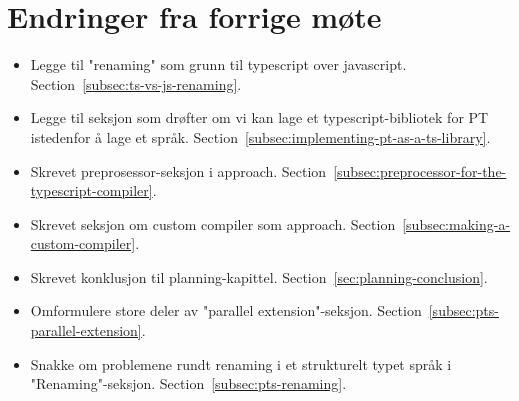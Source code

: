 
\chapter*{Endringer fra forrige møte}

\begin{itemize}
    \item Legge til "renaming" som grunn til typescript over javascript.
    Section~\vref{subsec:ts-vs-js-renaming}.
    \item Legge til seksjon som drøfter om vi kan lage et typescript-bibliotek for PT istedenfor å lage et språk.
    Section~\vref{subsec:implementing-pt-as-a-ts-library}.
    \item Skrevet preprosessor-seksjon i approach.
    Section~\vref{subsec:preprocessor-for-the-typescript-compiler}.
    \item Skrevet seksjon om custom compiler som approach.
    Section~\vref{subsec:making-a-custom-compiler}.
    \item Skrevet konklusjon til planning-kapittel.
    Section~\vref{sec:planning-conclusion}.
    \item Omformulere store deler av "parallel extension"-seksjon.
    Section~\vref{subsec:pts-parallel-extension}.
    \item Snakke om problemene rundt renaming i et strukturelt typet språk i "Renaming"-seksjon.
    Section~\vref{subsec:pts-renaming}.
\end{itemize}

